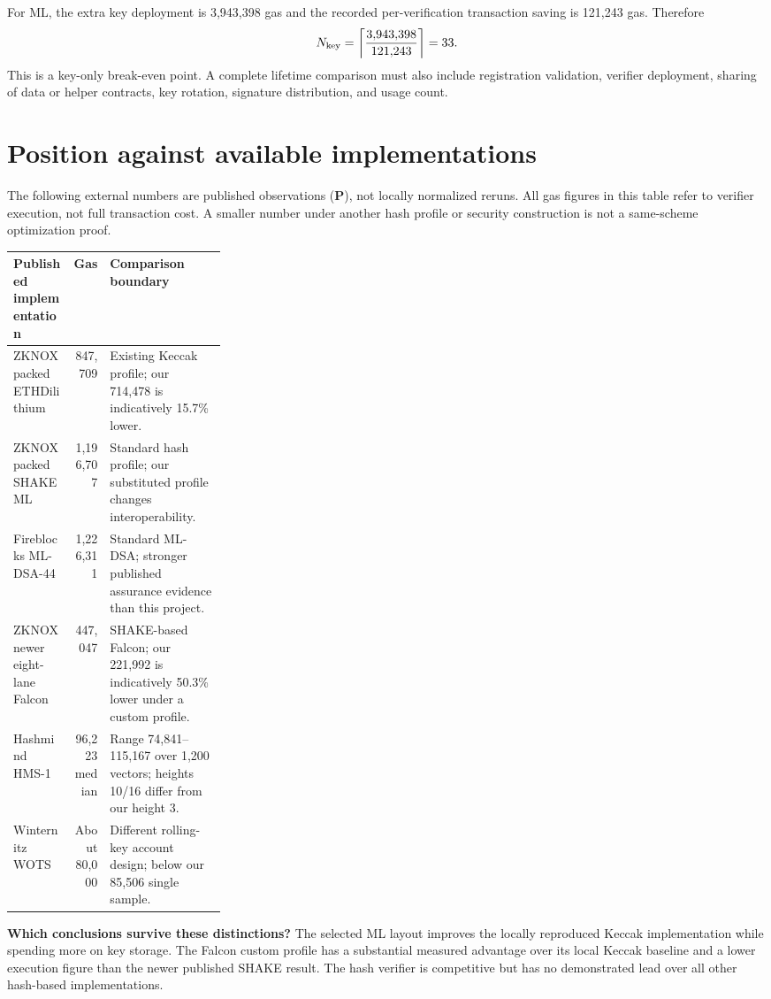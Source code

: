 \documentclass[11pt,a4paper]{article}
\newcommand{\published}{\textbf{P}}
\begin{document}
For ML, the extra key deployment is 3,943,398 gas and the recorded
per-verification transaction saving is 121,243 gas. Therefore
\begin{equation}
 N_{\rm key}=\left\lceil\frac{3{,}943{,}398}{121{,}243}\right\rceil=33.
\end{equation}
This is a key-only break-even point. A complete lifetime comparison must also
include registration validation, verifier deployment, sharing of data or
helper contracts, key rotation, signature distribution, and usage count.

\newpage
\section{Position against available implementations}
The following external numbers are published observations (\published), not
locally normalized reruns. All gas figures in this table refer to verifier
execution, not full transaction cost. A smaller number under another hash
profile or security construction is not a same-scheme optimization proof.

\begin{tabularx}{\linewidth}{P{0.28\linewidth}rY}
\toprule
\textbf{Published implementation} & \textbf{Gas} & \textbf{Comparison boundary}\\
\midrule
ZKNOX packed ETHDilithium \cite{ethdil} & 847,709 & Existing Keccak profile; our 714,478 is indicatively 15.7\% lower.\\
ZKNOX packed SHAKE ML \cite{ethdil} & 1,196,707 & Standard hash profile; our substituted profile changes interoperability.\\
Fireblocks ML-DSA-44 \cite{fireblocks} & 1,226,311 & Standard ML-DSA; stronger published assurance evidence than this project.\\
ZKNOX newer eight-lane Falcon \cite{ethfalcon} & 447,047 & SHAKE-based Falcon; our 221,992 is indicatively 50.3\% lower under a custom profile.\\
Hashmind HMS-1 \cite{hashmind} & 96,223 median & Range 74,841--115,167 over 1,200 vectors; heights 10/16 differ from our height 3.\\
Winternitz WOTS \cite{winternitz} & About 80,000 & Different rolling-key account design; below our 85,506 single sample.\\
\bottomrule
\end{tabularx}

\textbf{Which conclusions survive these distinctions?} The selected ML
layout improves the locally reproduced Keccak implementation while spending
more on key storage. The Falcon custom profile has a substantial measured
advantage over its local Keccak baseline and a lower execution figure than
the newer published SHAKE result. The hash verifier is competitive but has
no demonstrated lead over all other hash-based implementations.
\end{document}
